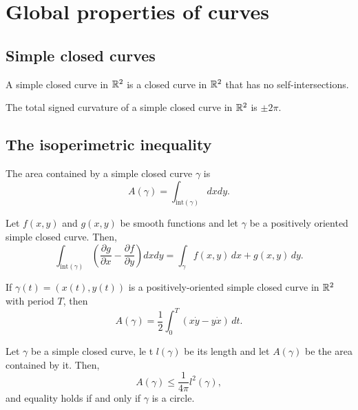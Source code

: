 \section{Global properties of curves}

\subsection{Simple closed curves}

\begin{defn}
  A simple closed curve in $\mathbb{R}^2$ is a closed curve in $\mathbb{R}^2$ that has no self-intersections.
\end{defn}

\begin{theorem}
  The total signed curvature of a simple closed curve in $\mathbb{R}^2$ is $\pm 2 \pi$.
\end{theorem}

\subsection{The isoperimetric inequality}

The area contained by a simple closed curve $\gamma$ is
\[
  A(\gamma) = \int_{\text{int}(\gamma)} dx dy.
\]

\begin{theorem}[Green]
  Let $f(x, y)$ and $g(x, y)$ be smooth functions
  and let $\gamma$ be a positively oriented simple closed curve. Then,
  \[
    \int_{\text{int}(\gamma)} \left(
      \frac{\partial g}{\partial x} - 
      \frac{\partial f}{\partial y}
    \right)
    dx dy =
    \int_{\gamma} f(x, y) \, dx + g(x, y) \, dy.
  \]
\end{theorem}

\begin{proposition}
  If $\gamma(t) = (x(t), y(t))$ is a positively-oriented simple closed curve
  in $\mathbb{R}^2$ with period $T$, then
  \[
    A(\gamma) = \frac{1}{2} \int_0^T (x \dot{y} - y \dot{x}) \, dt.
  \]
\end{proposition}

\begin{theorem}
  Let $\gamma$ be a simple closed curve, le t $l(\gamma)$ be its length and
  let $A(\gamma)$ be the area contained by it. Then,
  \[
    A(\gamma) \leq \frac{1}{4 \pi} l^2(\gamma),
  \]
  and equality holds if and only if $\gamma$ is a circle.
\end{theorem}

